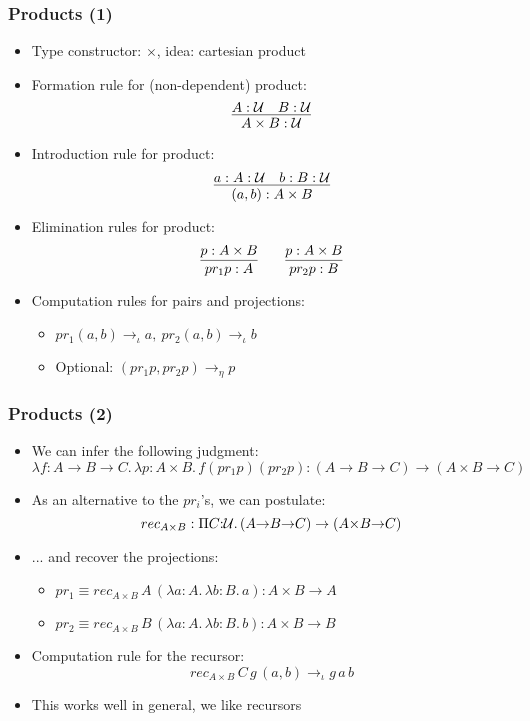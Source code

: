 \documentclass[handout]{beamer}
\newcommand{\depi}[3]{\Pi{#1{:}#2.\,#3}}
\newcommand{\lamt}[3]{\lambda{#1{:}#2.\,#3}}
\newcommand{\UU}{{\cal U}}
\begin{document}
\frame
  {
  
    \frametitle{Products (1)}

    \begin{itemize}[<+->]
    \item Type constructor: $\times$, idea: cartesian product
    \item Formation rule for (non-dependent) product:
\[\infer{{A}\times{B}:\UU}{A:\UU \quad B :\UU}\]
    \item Introduction rule for product:
\[\infer{(a,b):{A}\times{B}}{a:A:\UU \quad b:B:\UU}\]
    \item Elimination rules for product: 
\[\infer{pr_1 p:A}{p:A\times B}
\quad\quad
\infer{pr_2 p:B}{p:A\times B}\]
    \item Computation rules for pairs and projections:
       \begin{itemize}[<+->]
       \item $pr_1(a,b)\to_\iota a,~pr_2(a,b)\to_\iota b$
       \item Optional: $(pr_1 p,pr_2 p) \to_\eta p$
       \end{itemize}    
    \end{itemize}
  }

\frame
  {
  
    \frametitle{Products (2)}

    \begin{itemize}[<+->]
    \item We can infer the following judgment:
$$\lamt{f}{A{\to}B{\to}C}{\lamt{p}{A{\times}B}{f(pr_1 p)(pr_2 p)}}: (A{\to}B{\to}C)\to(A{\times}B{\to}C)$$
    \item As an alternative to the $pr_i$'s, we can postulate:
$$rec_{A{\times}B}:\depi{C}{\UU}{(A{\to}B{\to}C)\to(A{\times}B{\to}C)}$$
    \item ... and recover the projections:
       \begin{itemize}[<+->]
       \item $pr_1\equiv rec_{A{\times}B}\,A\,(\lamt{a}{A}{\lamt{b}{B}{a}}):A{\times}B{\to}A$
       \item $pr_2\equiv rec_{A{\times}B}\,B\,(\lamt{a}{A}{\lamt{b}{B}{b}}):A{\times}B{\to}B$
       \end{itemize}
    \item Computation rule for the {\color{red}recursor}: 
$$rec_{A{\times}B}\,C\,g\,(a,b)\to_\iota g\,a\,b$$
    \item This works well in general, we like recursors 
    \end{itemize}
  }
\end{document}
